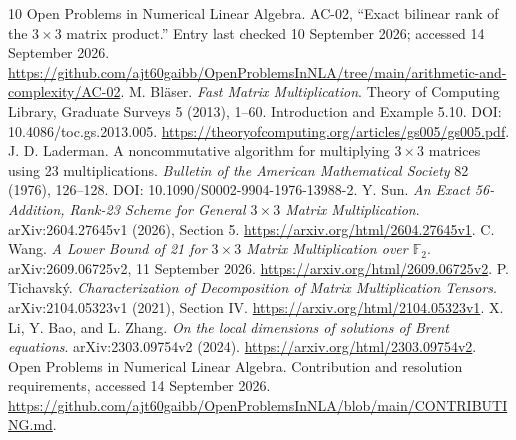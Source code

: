 \documentclass[11pt]{article}
\theoremstyle{definition}\newtheorem{definition}[theorem]{Definition}
\begin{document}
\begin{thebibliography}{10}
 Open Problems in Numerical Linear Algebra. AC-02, ``Exact bilinear rank of the $3\times3$ matrix product.'' Entry last checked 10 September 2026; accessed 14 September 2026. \url{https://github.com/ajt60gaibb/OpenProblemsInNLA/tree/main/arithmetic-and-complexity/AC-02}.
 M. Bl\"aser. \emph{Fast Matrix Multiplication}. Theory of Computing Library, Graduate Surveys 5 (2013), 1--60. Introduction and Example 5.10. DOI: 10.4086/toc.gs.2013.005. \url{https://theoryofcomputing.org/articles/gs005/gs005.pdf}.
 J. D. Laderman. A noncommutative algorithm for multiplying $3\times3$ matrices using 23 multiplications. \emph{Bulletin of the American Mathematical Society} 82 (1976), 126--128. DOI: 10.1090/S0002-9904-1976-13988-2.
 Y. Sun. \emph{An Exact 56-Addition, Rank-23 Scheme for General $3\times3$ Matrix Multiplication}. arXiv:2604.27645v1 (2026), Section 5. \url{https://arxiv.org/html/2604.27645v1}.
 C. Wang. \emph{A Lower Bound of 21 for $3\times3$ Matrix Multiplication over $\mathbb F_2$}. arXiv:2609.06725v2, 11 September 2026. \url{https://arxiv.org/html/2609.06725v2}.
 P. Tichavsk\'y. \emph{Characterization of Decomposition of Matrix Multiplication Tensors}. arXiv:2104.05323v1 (2021), Section IV. \url{https://arxiv.org/html/2104.05323v1}.
 X. Li, Y. Bao, and L. Zhang. \emph{On the local dimensions of solutions of Brent equations}. arXiv:2303.09754v2 (2024). \url{https://arxiv.org/html/2303.09754v2}.
 Open Problems in Numerical Linear Algebra. Contribution and resolution requirements, accessed 14 September 2026. \url{https://github.com/ajt60gaibb/OpenProblemsInNLA/blob/main/CONTRIBUTING.md}.
\end{thebibliography}
\end{document}
